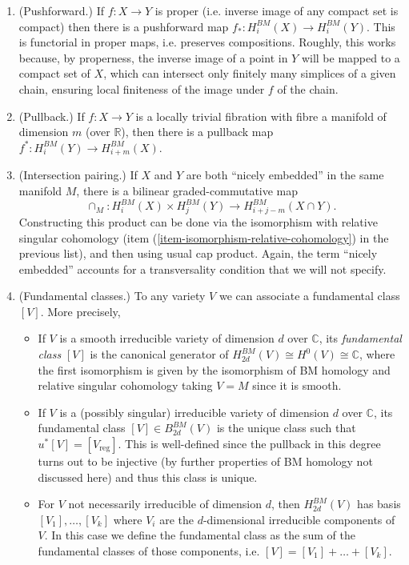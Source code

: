 \begin{enumerate}
\item (Pushforward.)
\label{item-pushforward}
If $f:X \to Y$ is proper
(i.e. inverse image of any compact set is
compact)
then there is a pushforward map $f_*
:H_i^{BM}(X)\to H_i^{BM}(Y)$.
This is functorial in proper maps,
i.e. preserves compositions.
Roughly, this works because, by properness,
the inverse image of
a point in $Y$ will be mapped to a compact
set of $X$,
which can intersect only finitely many
simplices of a given chain,
ensuring local finiteness of the image under
$f$ of the chain.

\item
\label{item-pullback}
(Pullback.) If $f:X \to Y$
is a locally trivial fibration with
fibre a manifold of dimension $m$ (over
$\mathbb{R}$),
then there is a pullback map
$f^* :H_i^{BM}(Y)\to H_{i+m}^{BM}(X)$.

\item
\label{item-intersection}
(Intersection pairing.) If $X$ and $Y$
are both ``nicely embedded'' in the same
manifold $M$, there is a bilinear
graded-commutative map
$$
\cap_M:H_i^{BM}(X)\times H_j^{BM}(Y)
\to H_{i+j-m}^{BM}(X\cap Y).
$$
Constructing this product can be done
via the isomorphism with relative singular
cohomology
(item
(\ref{item-isomorphism-relative-cohomology})
in the previous list),
and then using usual cap product.
Again, the term ``nicely embedded'' accounts
for a transversality condition that we will
not
specify.

\item (Fundamental classes.)
\label{item-fundamental-class}
To any variety $V$ we can associate a
fundamental class $[V]$.
More precisely,
\begin{itemize}
\item If $V$ is a smooth irreducible variety
of dimension $d$ over $\mathbb{C}$,
its {\it fundamental class} $[V]$ is the
canonical generator of
$H_{2d}^{BM}(V)\cong H^0(V)\cong \mathbb{C}$,
where the first isomorphism
is given by the isomorphism of BM homology
and
relative singular cohomology taking $V = M$
since it is smooth.

\item If $V$ is a (possibly singular)
irreducible variety of dimension $d$
over $\mathbb{C}$, its fundamental class
$[V] \in B_{2d}^{BM}(V)$
is the unique class such that
$u^* [V]=[V_{\text{reg}}]$.
This is well-defined since
the pullback in this degree turns
out to be injective (by further properties
of BM homology not discussed here)
and thus this class is unique.

\item For $V$ not necessarily irreducible
of dimension $d$, then $H_{2d}^{BM}(V)$
has basis $[V_1],\ldots,[V_k]$
where $V_i$ are the $d$-dimensional
irreducible components of $V$.
In this case we define the fundamental class
as the sum of the fundamental classes of
those
components, i.e. $[V]=[V_1]+\ldots+[V_k]$.
\end{itemize}
\end{enumerate}


